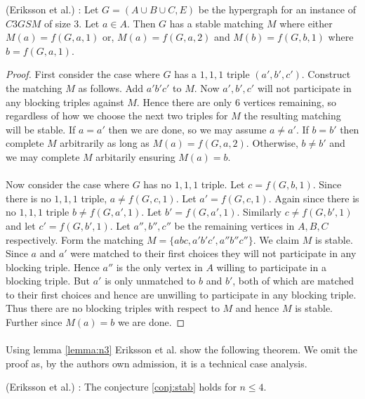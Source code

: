 \begin{lemma}\label{lemma:n3}
(Eriksson et al.) \cite{eriksson2006three}: Let $G=(A\cup B \cup C, E)$ be the hypergraph for an instance of $C3GSM$ of size $3$. Let $a \in A$. Then $G$ has a stable matching $M$ where either $M(a)= f(G,a,1)$ or, $M(a) = f(G,a,2)$ and $M(b) = f(G,b,1)$ where $b = f(G,a,1)$.
\end{lemma}
\begin{proof} First consider the case where $G$ has a $1,1,1$ triple $(a',b',c')$. Construct the matching $M$ as follows. Add $a'b'c'$ to $M$. Now $a',b',c'$ will not participate in any blocking triples against $M$. Hence there are only $6$ vertices remaining, so regardless of how we choose the next two triples for $M$ the resulting matching will be stable. If $a = a'$ then we are done, so we may assume $a\neq a'$. If $b = b'$ then complete $M$ arbitrarily as long as $M(a) = f(G,a,2)$. Otherwise, $b\neq b'$ and we may complete $M$ arbitarily ensuring $M(a) = b$.
\paragraph{} Now consider the case where $G$ has no $1,1,1$ triple. Let $c = f(G,b,1)$. Since there is no $1,1,1$ triple, $a \neq f(G,c,1)$. Let $a' = f(G,c,1)$. Again since there is no $1,1,1$ triple $b \neq f(G,a',1)$. Let $b' = f(G,a',1)$. Similarly $c \neq f(G,b',1)$ and let $c' = f(G,b',1)$. Let $a'', b'', c''$ be the remaining vertices in $A,B,C$ respectively. Form the matching $M = \{abc,a'b'c',a''b''c''\}$. We claim $M$ is stable. Since $a$ and $a'$ were matched to their first choices they will not participate in any blocking triple. Hence $a''$ is the only vertex in $A$ willing to participate in a blocking triple. But $a'$ is only unmatched to $b$ and $b'$, both of which are matched to their first choices and hence are unwilling to participate in any blocking triple. Thus there are no blocking triples with respect to $M$ and hence $M$ is stable. Further since $M(a) = b$ we are done. 
\end{proof}
\paragraph{}
Using lemma \ref{lemma:n3} Eriksson et al. show the following theorem. We omit the proof as, by the authors own admission, it is a technical case analysis.
\begin{theorem}(Eriksson et al.) \label{theorem:n4} \cite{eriksson2006three}: The conjecture \ref{conj:stab} holds for $n\leq 4$.
\end{theorem}
